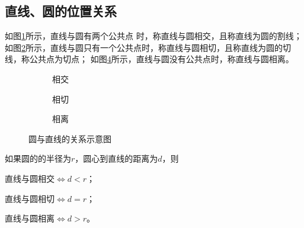 \subsection{直线、圆的位置关系}
\begin{definition}[直线与圆的位置关系]
    如图\ref{图圆与直线相交}所示，直线与圆有两个公共点
时，称直线与圆相交，且称直线为圆的割线；
如图\ref{图圆与直线相切}所示，直线与圆只有一个公共点时，称直线与圆相切，且称直线为圆的切线，称公共点为切点；
如图\ref{图圆与直线相离}所示，直线与圆没有公共点时，称直线与圆相离。
\end{definition}
\begin{figure}[h]
    \centering
    \begin{subfigure}[b]{0.3\textwidth}
        \centering
        \caption{相交}
        \label{图圆与直线相交}
    \end{subfigure}
    \hfill
    \begin{subfigure}[b]{0.3\textwidth}
        \centering
        \caption{相切}
        \label{图圆与直线相切}
    \end{subfigure}
    \hfill
    \begin{subfigure}[b]{0.3\textwidth}
        \centering
        \caption{相离}
        \label{图圆与直线相离}
    \end{subfigure}
    \caption{圆与直线的关系示意图}
\end{figure}

\begin{theorem}
    如果圆的的半径为\(r\)，圆心到直线的距离为\(d\)，则

    \centering     直线与圆相交\(\Leftrightarrow d<r\)；

    \centering     直线与圆相切\(\Leftrightarrow d=r\)；

    \centering     直线与圆相离\(\Leftrightarrow d>r\)。
\end{theorem}
\begin{jie}
    
\end{jie}





